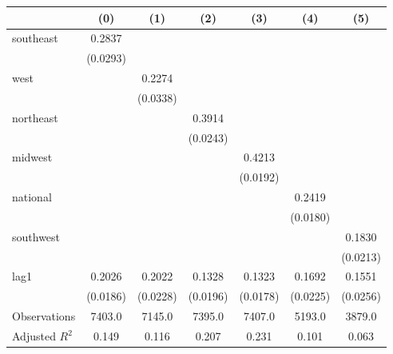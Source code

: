 \begin{tabular}{lcccccc}
\toprule
 & (0) & (1) & (2) & (3) & (4) & (5) \\
\midrule
southeast & 0.2837 &  &  &  &  &  \\
\vspace{0.2cm}
 & (0.0293) &  &  &  &  &  \\
west &  & 0.2274 &  &  &  &  \\
\vspace{0.2cm}
 &  & (0.0338) &  &  &  &  \\
northeast &  &  & 0.3914 &  &  &  \\
\vspace{0.2cm}
 &  &  & (0.0243) &  &  &  \\
midwest &  &  &  & 0.4213 &  &  \\
\vspace{0.2cm}
 &  &  &  & (0.0192) &  &  \\
national &  &  &  &  & 0.2419 &  \\
\vspace{0.2cm}
 &  &  &  &  & (0.0180) &  \\
southwest &  &  &  &  &  & 0.1830 \\
\vspace{0.2cm}
 &  &  &  &  &  & (0.0213) \\
lag1 & 0.2026 & 0.2022 & 0.1328 & 0.1323 & 0.1692 & 0.1551 \\
\vspace{0.2cm}
 & (0.0186) & (0.0228) & (0.0196) & (0.0178) & (0.0225) & (0.0256) \\
\midrule
Observations & 7403.0 & 7145.0 & 7395.0 & 7407.0 & 5193.0 & 3879.0 \\
Adjusted $R^2$ & 0.149 & 0.116 & 0.207 & 0.231 & 0.101 & 0.063 \\
\bottomrule
\end{tabular}
